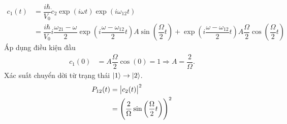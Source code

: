 \documentclass{article}
\newcommand{\f}[2]{\dfrac{#1}{#2}}
\begin{document}
\begin{enumerate}
\begin{align*}
	\end{align*}
	\begin{align*}
		c_{1} (t)
		&= \f{i\hbar}{V_{0}}\dot{c}_{2} \exp(i\omega t)\exp(i \omega_{12} t)\\
		&= \f{i\hbar}{V_{0}}i \f{\omega_{21} - \omega}{2} \exp\left(i \f{\omega - \omega_{12}}{2}t\right) A\sin\left(\f{\Omega}{2}t\right) + \exp\left(i \f{\omega - \omega_{12}}{2}t\right) A\f{\Omega}{2}\cos\left(\f{\Omega}{2} t\right)
	\end{align*}
	Áp dụng điều kiện đầu
	\begin{align*}
		c_{1}(0)
		&= A\f{\Omega}{2}\cos(0) = 1 \Rightarrow A = \f{2}{\Omega}.
	\end{align*}
	Xác suất chuyển dời từ trạng thái $\ket{1} \rightarrow \ket{2}$.
	\begin{align*}
		P_{12}(t)
		& = \abs{c_{2}(t)}^2\\
		&= \left(\f{2}{\Omega} \sin\left(\f{\Omega}{2}t\right) \right)^2
	\end{align*}

\end{enumerate}
 	
	
\end{document}
